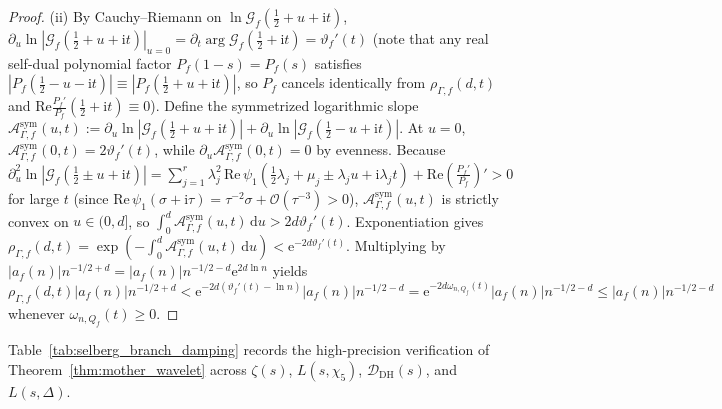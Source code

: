 \documentclass[11pt,reqno]{amsart}
\theoremstyle{definition}
\theoremstyle{remark}
\numberwithin{equation}{section}
\newcommand{\dd}{\mathrm{d}}
\newcommand{\ee}{\mathrm{e}}
\newcommand{\ii}{\mathrm{i}}
\newcommand{\Rea}{\mathrm{Re}}
\newcommand{\DHf}{\mathrm{DH}}
\begin{document}
\begin{proof}
(ii) By Cauchy--Riemann on $\ln\mathcal{G}_f(\frac{1}{2}+u+\ii t)$, $\partial_u\ln|\mathcal{G}_f(\frac{1}{2}+u+\ii t)|_{u=0} = \partial_t\arg\mathcal{G}_f(\frac{1}{2}+\ii t) = \vartheta_f'(t)$ (note that any real self-dual polynomial factor $P_f(1-s) = P_f(s)$ satisfies $|P_f(\frac{1}{2}-u-\ii t)| \equiv |P_f(\frac{1}{2}+u+\ii t)|$, so $P_f$ cancels identically from $\rho_{\Gamma,f}(d,t)$ and $\Rea\frac{P_f'}{P_f}(\frac{1}{2}+\ii t) \equiv 0$). Define the symmetrized logarithmic slope $\mathcal{A}_{\Gamma,f}^{\mathrm{sym}}(u,t) := \partial_u\ln|\mathcal{G}_f(\frac{1}{2}+u+\ii t)| + \partial_u\ln|\mathcal{G}_f(\frac{1}{2}-u+\ii t)|$. At $u = 0$, $\mathcal{A}_{\Gamma,f}^{\mathrm{sym}}(0,t) = 2\vartheta_f'(t)$, while $\partial_u\mathcal{A}_{\Gamma,f}^{\mathrm{sym}}(0,t) = 0$ by evenness. Because $\partial_u^2\ln|\mathcal{G}_f(\frac{1}{2}\pm u+\ii t)| = \sum_{j=1}^r \lambda_j^2\,\Rea\,\psi_1(\frac{1}{2}\lambda_j + \mu_j \pm \lambda_j u + \ii\lambda_j t) + \Rea(\frac{P_f'}{P_f})' > 0$ for large $t$ (since $\Rea\,\psi_1(\sigma+\ii\tau) = \tau^{-2}\sigma + \mathcal{O}(\tau^{-3}) > 0$), $\mathcal{A}_{\Gamma,f}^{\mathrm{sym}}(u,t)$ is strictly convex on $u \in (0, d]$, so $\int_0^d \mathcal{A}_{\Gamma,f}^{\mathrm{sym}}(u,t)\,\dd u > 2d\vartheta_f'(t)$. Exponentiation gives $\rho_{\Gamma,f}(d,t) = \exp(-\int_0^d \mathcal{A}_{\Gamma,f}^{\mathrm{sym}}(u,t)\,\dd u) < \ee^{-2d\vartheta_f'(t)}$. Multiplying by $|a_f(n)|n^{-1/2+d} = |a_f(n)|n^{-1/2-d}\ee^{2d\ln n}$ yields $\rho_{\Gamma,f}(d,t)|a_f(n)|n^{-1/2+d} < \ee^{-2d(\vartheta_f'(t)-\ln n)}|a_f(n)|n^{-1/2-d} = \ee^{-2d\omega_{n,Q_f}(t)}|a_f(n)|n^{-1/2-d} \le |a_f(n)|n^{-1/2-d}$ whenever $\omega_{n,Q_f}(t) \ge 0$.
\end{proof}

Table~\ref{tab:selberg_branch_damping} records the high-precision verification of Theorem~\ref{thm:mother_wavelet} across $\zeta(s)$, $L(s,\chi_5)$, $\mathcal{D}_{\DHf}(s)$, and $L(s,\Delta)$.
\end{document}
